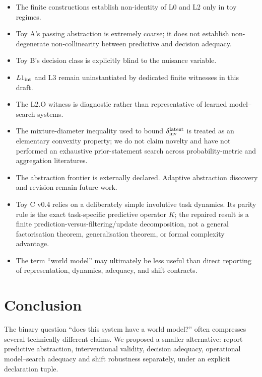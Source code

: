 \documentclass[10pt]{article}
\begin{document}
\begin{itemize}
    \item The finite constructions establish non-identity of L0 and L2 only in toy regimes.
    \item Toy A's passing abstraction is extremely coarse; it does not establish non-degenerate non-collinearity between predictive and decision adequacy.
    \item Toy B's decision class is explicitly blind to the nuisance variable.
    \item $L1_{\rm int}$ and L3 remain uninstantiated by dedicated finite witnesses in this draft.
    \item The L2.O witness is diagnostic rather than representative of learned model--search systems.
    \item The mixture-diameter inequality used to bound $\delta_{\rm inv}^{\rm latent}$ is treated as an elementary convexity property; we do not claim novelty and have not performed an exhaustive prior-statement search across probability-metric and aggregation literatures.
    \item The abstraction frontier is externally declared. Adaptive abstraction discovery and revision remain future work.
    \item Toy C v0.4 relies on a deliberately simple involutive task dynamics. Its parity rule is the exact task-specific predictive operator $K$; the repaired result is a finite prediction-versus-filtering/update decomposition, not a general factorisation theorem, generalisation theorem, or formal complexity advantage.
    \item The term ``world model'' may ultimately be less useful than direct reporting of representation, dynamics, adequacy, and shift contracts.
\end{itemize}

\section{Conclusion}

The binary question ``does this system have a world model?'' often compresses several technically different claims. We proposed a smaller alternative: report predictive abstraction, interventional validity, decision adequacy, operational model--search adequacy and shift robustness separately, under an explicit declaration tuple.
\end{document}
